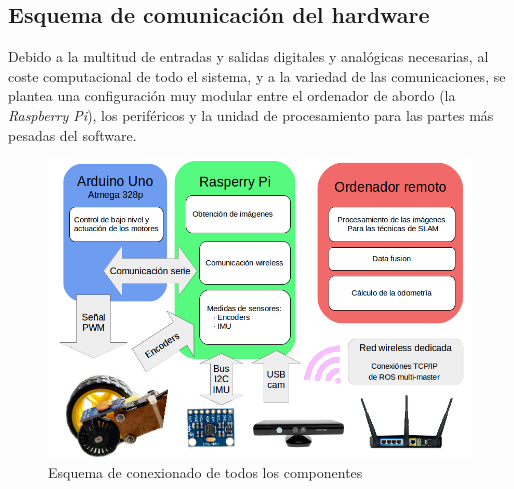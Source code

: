 \subsection{Esquema de comunicación del hardware}
Debido a la multitud de entradas y salidas digitales y analógicas necesarias, al coste computacional de todo el sistema, y a la variedad de las comunicaciones, se plantea una configuración muy modular 
entre el ordenador de abordo (la \textit{Raspberry Pi}), los periféricos y la unidad de procesamiento para las partes más pesadas del software.\\
  \begin{figure}[h!]
  	\centering
  	\includegraphics[width=.9\textwidth]{images/hw/wheele_esquema}
  	\caption{Esquema de conexionado de todos los componentes}
  \end{figure}